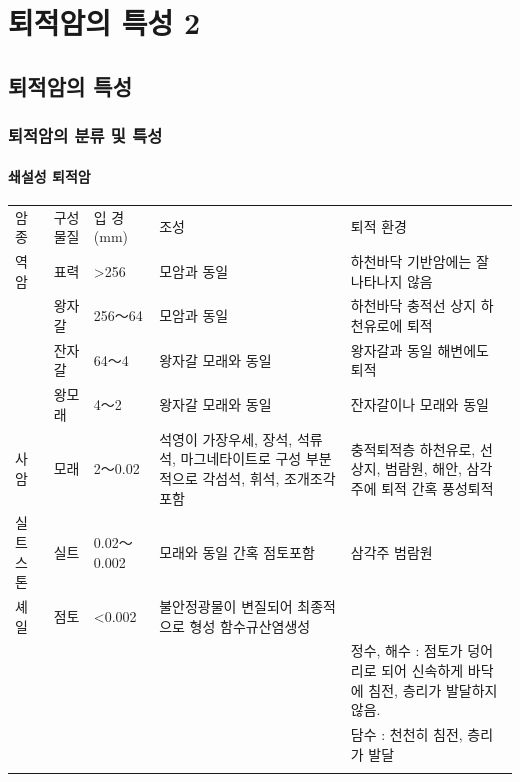 \documentclass[12pt, a4paper, twoside]{book}
\begin{document}
	\clearpage
	\chapter{퇴적암의 특성 2}
	\minitoc				%




	\clearpage
	\section{퇴적암의 특성}


		
		\subsection{퇴적암의 분류 및 특성}

			\subsubsection{쇄설성 퇴적암}
				\begin{tabu} to 1.0\textwidth { X[l, 2.0] X[l, 4.0] X[l, 4.0] X[l, 4.0] X[l, 4.0]}
				\tabucline[0.2ex]{-}		
				암종		&구성 물질		&입 경(mm)		&조성				&퇴적 환경 	\\
				\tabucline[0.1ex]{-}		
				역암		&표력			&>256			&모암과 동일			&하천바닥 기반암에는 잘 나타나지 않음\\
						&왕자갈			&256～64			&모암과 동일			&하천바닥 충적선 상지 하천유로에 퇴적	\\
						&잔자갈			&64～4			&왕자갈 모래와 동일		&왕자갈과 동일 해변에도 퇴적		\\
						&왕모래			&4～2			&왕자갈 모래와 동일		&잔자갈이나 모래와 동일	\\
				사암		&모래			&2～0.02			&석영이 가장우세, 장석, 석류석,  마그네타이트로 구성 부분적으로 각섬석, 휘석, 조개조각 포함
																		&충적퇴적층 하천유로, 선상지, 범람원, 해안, 삼각주에 퇴적 간혹 풍성퇴적 \\
				실트스톤	&실트			&0.02～0.002		&모래와 동일 간혹 점토포함	
																		&삼각주 범람원	\\
				셰일		&점토			&<0.002			&불안정광물이 변질되어 최종적으로 형성 함수규산염생성 \\
						&				&				&					&정수, 해수 : 점토가 덩어리로 되어 신속하게 바닥에 침전, 층리가 발달하지 않음. \\
						&				&				&					&담수 : 천천히 침전, 층리가 발달 \\
				\tabucline[0.1ex]{-}		
				\end{tabu} 
\end{document}
